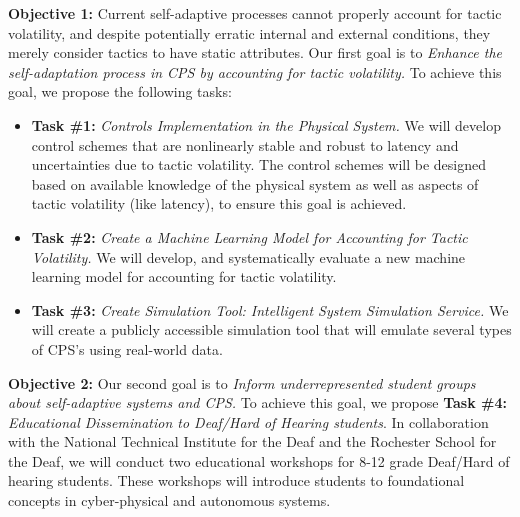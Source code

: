 \documentclass[11pt]{proposalnsf}
\newcommand{\dan}[1]{\textcolor{blue}{{\it [Dan says: #1]}}}
\newlength\q %
\begin{document}
\begin{sloppypar}
\vspace{3mm}\noindent \textbf{Objective 1:} Current self-adaptive processes cannot properly account for tactic volatility, and despite potentially erratic internal and external conditions, they merely consider tactics to have static attributes. Our first goal is to \emph{Enhance the self-adaptation process in CPS by accounting for tactic volatility.} To achieve this goal, we propose the following tasks:

\begin{itemize}[noitemsep]
\item \textbf{Task \#1:} \emph{Controls Implementation in the Physical System.} We will develop control schemes that are nonlinearly stable and robust to latency and uncertainties due to tactic volatility. The control schemes will be designed based on available knowledge of the physical system as well as aspects of tactic volatility (like latency), to ensure this goal is achieved. 

\item \textbf{Task \#2:} \emph{Create a Machine Learning Model for Accounting for Tactic Volatility.} We will develop, and systematically evaluate a new machine learning model for accounting for tactic volatility.%

\item \textbf{Task \#3:} \emph{Create Simulation Tool: Intelligent System Simulation Service.} We will create a publicly accessible simulation tool that will emulate several types of CPS's using real-world data. %
\end{itemize}


\vspace{2mm}\noindent \textbf{Objective 2:} Our second goal is to \emph{Inform underrepresented student groups about self-adaptive systems and CPS.} To achieve this goal, we propose \textbf{Task \#4:} \emph{Educational Dissemination to Deaf/Hard of Hearing students}. In collaboration with the National Technical Institute for the Deaf and the Rochester School for the Deaf, we will conduct two educational workshops for 8-12 grade Deaf/Hard of hearing students. These workshops will introduce students to foundational concepts in cyber-physical and autonomous systems.



\end{sloppypar}
\end{document}
